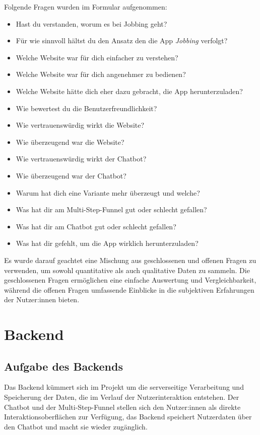 Folgende Fragen wurden im Formular aufgenommen:
\begin{itemize}
    \item Hast du verstanden, worum es bei Jobbing geht?
    \item Für wie sinnvoll hältst du den Ansatz den die App \textit{Jobbing} verfolgt?
    \item Welche Website war für dich einfacher zu verstehen?  
    \item Welche Website war für dich angenehmer zu bedienen?  
    \item Welche Website hätte dich eher dazu gebracht, die App herunterzuladen?  
    \item Wie bewertest du die Benutzerfreundlichkeit?  
    \item Wie vertrauenswürdig wirkt die Website?  
    \item Wie überzeugend war die Website?  
    \item Wie vertrauenswürdig wirkt der Chatbot?  
    \item Wie überzeugend war der Chatbot?  
    \item Warum hat dich eine Variante mehr überzeugt und welche?  
    \item Was hat dir am Multi-Step-Funnel gut oder schlecht gefallen?  
    \item Was hat dir am Chatbot gut oder schlecht gefallen?  
    \item Was hat dir gefehlt, um die App wirklich herunterzuladen?  
\end{itemize}

Es wurde darauf geachtet eine Mischung aus geschlossenen und 
offenen Fragen zu verwenden, um sowohl quantitative als auch 
qualitative Daten zu sammeln. Die geschlossenen Fragen 
ermöglichen eine einfache Auswertung und Vergleichbarkeit, 
während die offenen Fragen umfassende Einblicke in die subjektiven 
Erfahrungen der Nutzer:innen bieten.

\setauthor{\secondauthor}
\section{Backend}

\subsection{Aufgabe des Backends}

Das Backend kümmert sich im Projekt um die serverseitige Verarbeitung und Speicherung der Daten, die im
Verlauf der Nutzerinteraktion entstehen. Der Chatbot und der Multi-Step-Funnel stellen sich den Nutzer:innen als direkte
Interaktionsoberflächen zur Verfügung, das Backend speichert Nutzerdaten über den Chatbot 
und macht sie wieder zugänglich.

